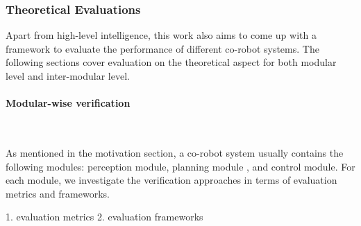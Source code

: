 \begin{comment}
Robot predicting and responding to human is neccesary, and it would be more productive if robot is proactive. \cite{baraglia2016initiative} shows that people collaborate best with a proactive robot which takes initiative, yielding better team fluency and high subjective ratings. \cite{devin2017decisions} even shows in which conditions the robot can determine when it has to take the decision by itself or leave it to its human partner. Thus, when a robot is taking the lead, it is also important for robot to act explicitly and predictably so that plans synthesized by the robot can be easily understood by humans when doing task planning. Zhang et al. \cite{zhang2017plan} use conditional random fields to learn the labeling scheme of human which is to associate abstract tasks with robot actions. Then, they use the learned model to label a new plan to compute its explicability and predictability. These measures can be used by robots to proactively choose or directly synthesize plans that are more explicable and predictable.
\end{comment}

\subsubsection{Theoretical Evaluations}

Apart from high-level intelligence, this work also aims to come up with a framework to evaluate the performance of different co-robot systems. The following sections cover evaluation on the theoretical aspect for both modular level and inter-modular level. 

\paragraph{Modular-wise verification}~

As mentioned in the motivation section, a co-robot system usually contains the following modules: perception module, planning module , and control module. For each module, we investigate the verification approaches in terms of evaluation metrics and frameworks. 

1. evaluation metrics
2. evaluation frameworks

